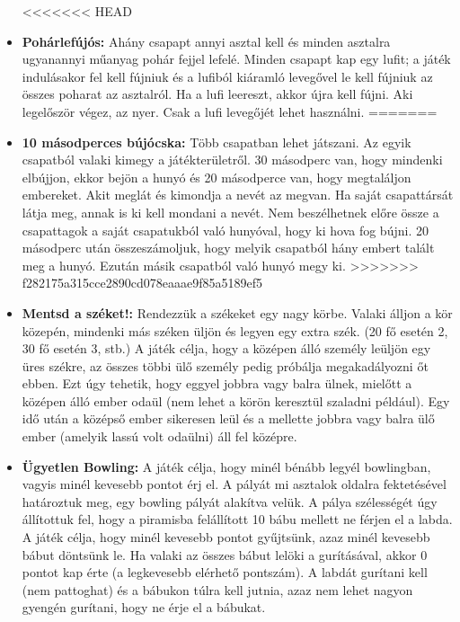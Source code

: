\documentclass[a4paper, 12pt, twoside, openright]{article}
\begin{document}
\begin{itemize}
<<<<<<< HEAD
\item \textbf{Pohárlefújós:} Ahány csapapt annyi asztal kell és minden asztalra ugyanannyi műanyag pohár fejjel lefelé. Minden csapapt kap egy lufit; a játék indulásakor fel kell fújniuk és a lufiból kiáramló levegővel le kell fújniuk az összes poharat az asztalról. Ha a lufi leereszt, akkor újra kell fújni. Aki legelőször végez, az nyer. Csak a lufi levegőjét lehet használni.
=======
\item \textbf{10 másodperces bújócska:} Több csapatban lehet játszani. Az egyik csapatból valaki kimegy a játékterületről. 30 másodperc van, hogy mindenki elbújjon, ekkor bejön a hunyó és 20 másodperce van, hogy megtaláljon embereket. Akit meglát és kimondja a nevét az megvan. Ha saját csapattársát látja meg, annak is ki kell mondani a nevét. Nem beszélhetnek előre össze a csapattagok a saját csapatukból való hunyóval, hogy ki hova fog bújni. 20 másodperc után összeszámoljuk, hogy melyik csapatból hány embert talált meg a hunyó. Ezután másik csapatból való hunyó megy ki. 
>>>>>>> f282175a315cce2890cd078eaaae9f85a5189ef5

\item \textbf{Mentsd a széket!:} Rendezzük a székeket egy nagy körbe. Valaki álljon a kör közepén, mindenki más széken üljön és legyen egy extra szék. (20 fő esetén 2, 30 fő esetén 3, stb.) A játék célja, hogy a középen álló személy leüljön egy üres székre, az összes többi ülő személy pedig próbálja megakadályozni őt ebben. Ezt úgy tehetik, hogy eggyel jobbra vagy balra ülnek, mielőtt a középen álló ember odaül (nem lehet a körön keresztül szaladni például). Egy idő után a középső ember sikeresen leül és a mellette jobbra vagy balra ülő ember (amelyik lassú volt odaülni) áll fel középre.

\item \textbf{Ügyetlen Bowling:} A játék célja, hogy minél bénább legyél bowlingban, vagyis minél kevesebb pontot érj el. A pályát mi asztalok oldalra fektetésével határoztuk meg, egy bowling pályát alakítva velük. A pálya szélességét úgy állítottuk fel, hogy a piramisba felállított 10 bábu mellett ne férjen el a labda. A játék célja, hogy minél kevesebb pontot gyűjtsünk, azaz minél kevesebb bábut döntsünk le. Ha valaki az összes bábut lelöki a gurításával, akkor 0 pontot kap érte (a legkevesebb elérhető pontszám). A labdát gurítani kell (nem pattoghat) és a bábukon túlra kell jutnia, azaz nem lehet nagyon gyengén gurítani, hogy ne érje el a bábukat.


\end{itemize}
\end{document}
